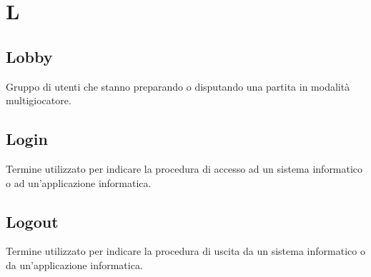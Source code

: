 \section{L}
    \subsection{Lobby}
        Gruppo di utenti che stanno preparando o disputando una partita in modalità multigiocatore.
	\subsection{Login}
		Termine utilizzato per indicare la procedura di accesso ad un sistema informatico o ad un'applicazione informatica.
    \subsection{Logout}
        Termine utilizzato per indicare la procedura di uscita da un sistema informatico o da un'applicazione informatica.		
\newpage
